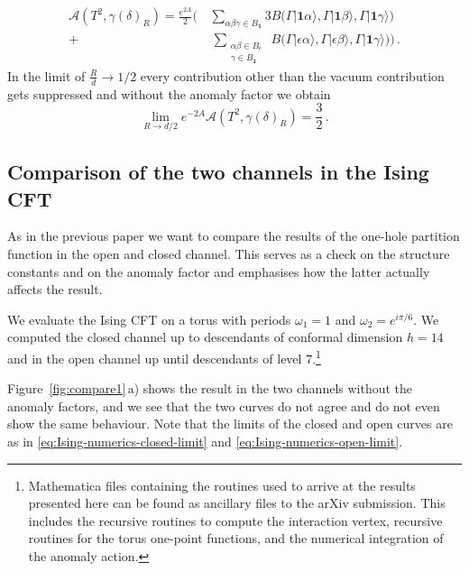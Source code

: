 \documentclass[11pt,a4paper]{article}
\numberwithin{equation}{section}
\newcommand{\one}{\mathbf{1}} %
\begin{document}
%
\begin{equation}\label{eq:Ising-numerics-open-limit}
    \begin{split}
        \mathcal{A}\left(T^2,\gamma(\delta)_R\right) =  \frac{e^{2A}}{2} \Bigg(\,&\sum\limits_{\alpha\beta\gamma\in B_\one} 3  B\big( \Gamma |\one\alpha\rangle, \Gamma |\one\beta\rangle, \Gamma  |\one\gamma\rangle \big) \\
        + &\,\sum\limits_{\begin{smallmatrix}\alpha\beta\in B_\epsilon\\\gamma\in B_\one\end{smallmatrix}} ~ B\big( \Gamma |\epsilon\alpha\rangle, \Gamma |\epsilon\beta\rangle, \Gamma  |\one\gamma\rangle \big)\Bigg)\,.
    \end{split}
\end{equation}
%
In the limit of $\frac{R}{d} \to 1/2$ every contribution other than the vacuum contribution gets suppressed and without the anomaly factor we obtain
%
\begin{equation}
    \lim_{R \to d/2} e^{-2A}\mathcal{A}\left(T^2,\gamma(\delta)_R\right) =  \frac{3}{2}\,.
\end{equation}



\subsection{Comparison of the two channels in the Ising CFT}

As in the previous paper we want to compare the results of the one-hole partition function in the open and closed channel. This serves as a check on the structure constants and on the anomaly factor and emphasises how the latter actually affects the result. 

We evaluate the Ising CFT on a torus with periods $\omega_1 =1$ and $\omega_2=e^{i\pi/6}$. We computed the closed channel up to descendants of conformal dimension $h=14$ and in the open channel up until descendants of level $7$.\footnote{
    \textsf{Mathematica} files containing the routines used to arrive at the results presented here can be found as ancillary files to the arXiv submission. This includes the recursive routines to compute the interaction vertex, recursive routines for the torus one-point functions, and the numerical integration of the anomaly action.}

Figure~\ref{fig:compare1}\,a) shows the result in the two channels without the anomaly factors, and we see that the two curves do not agree and do not even show the same behaviour.
Note that the limits of the closed and open curves are as in \eqref{eq:Ising-numerics-closed-limit} and \eqref{eq:Ising-numerics-open-limit}.
    
\end{document}
